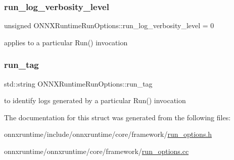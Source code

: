 \subsubsection{\texorpdfstring{run\+\_\+log\+\_\+verbosity\+\_\+level}{run\_log\_verbosity\_level}}
{\footnotesize\ttfamily unsigned O\+N\+N\+X\+Runtime\+Run\+Options\+::run\+\_\+log\+\_\+verbosity\+\_\+level = 0}



applies to a particular Run() invocation 

\mbox{\label{structONNXRuntimeRunOptions_a99098c7d810216a1b1dab088cdf548e5}} 
\subsubsection{\texorpdfstring{run\+\_\+tag}{run\_tag}}
{\footnotesize\ttfamily std\+::string O\+N\+N\+X\+Runtime\+Run\+Options\+::run\+\_\+tag}



to identify logs generated by a particular Run() invocation 



The documentation for this struct was generated from the following files\+:\begin{DoxyCompactItemize}
\item 
onnxruntime/include/onnxruntime/core/framework/\mbox{\hyperlink{run__options_8h}{run\+\_\+options.\+h}}\item 
onnxruntime/onnxruntime/core/framework/\mbox{\hyperlink{run__options_8cc}{run\+\_\+options.\+cc}}\end{DoxyCompactItemize}

